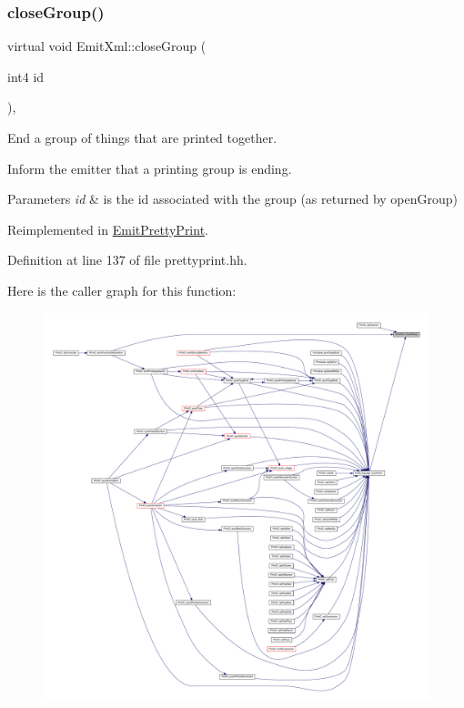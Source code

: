 \subsubsection{\texorpdfstring{closeGroup()}{closeGroup()}}
{\footnotesize\ttfamily virtual void Emit\+Xml\+::close\+Group (\begin{DoxyParamCaption}\item[{int4}]{id }\end{DoxyParamCaption})\hspace{0.3cm}{\ttfamily [inline]}, {\ttfamily [virtual]}}



End a group of things that are printed together. 

Inform the emitter that a printing group is ending. 
\begin{DoxyParams}{Parameters}
{\em id} & is the id associated with the group (as returned by open\+Group) \\
\hline
\end{DoxyParams}


Reimplemented in \mbox{\hyperlink{class_emit_pretty_print_a3a7553ee225ff54a164108ce0ab55102}{Emit\+Pretty\+Print}}.



Definition at line 137 of file prettyprint.\+hh.

Here is the caller graph for this function\+:
\nopagebreak
\begin{figure}[H]
\begin{center}
\leavevmode
\includegraphics[width=350pt]{class_emit_xml_ade0028d33afa198f7211e21c9c673231_icgraph}
\end{center}
\end{figure}
\mbox{\label{class_emit_xml_a3442a3f23a65cfcf073d57cf64733493}} 
